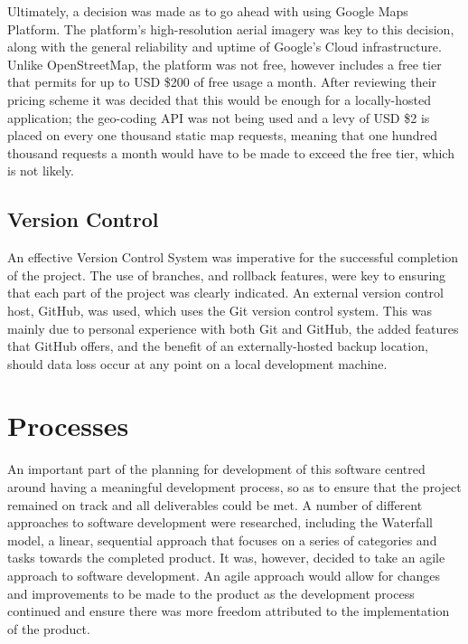 Ultimately, a decision was made as to go ahead with using Google Maps Platform. The platform's high-resolution aerial imagery was key to this decision, along with the general reliability and uptime of Google's Cloud infrastructure. Unlike OpenStreetMap, the platform was not free, however includes a free tier that permits for up to USD \$200 of free usage a month. After reviewing their pricing scheme it was decided that this would be enough for a locally-hosted application; the geo-coding API was not being used and a levy of USD \$2 is placed on every one thousand static map requests, meaning that one hundred thousand requests a month would have to be made to exceed the free tier, which is not likely\cite{GoogleCloudPricing}.

\subsection{Version Control}

An effective Version Control System was imperative for the successful completion of the project. The use of branches, and rollback features, were key to ensuring that each part of the project was clearly indicated. An external version control host, GitHub, was used, which uses the Git version control system. This was mainly due to personal experience with both Git and GitHub, the added features that GitHub offers, and the benefit of an externally-hosted backup location, should data loss occur at any point on a local development machine\cite{GitHub}.

\section{Processes}

An important part of the planning for development of this software centred around having a meaningful development process, so as to ensure that the project remained on track and all deliverables could be met. A number of different approaches to software development were researched, including the Waterfall model, a linear, sequential approach that focuses on a series of categories and tasks towards the completed product. It was, however, decided to take an agile approach to software development. An agile approach would allow for changes and improvements to be made to the product as the development process continued and ensure there was more freedom attributed to the implementation of the product.

